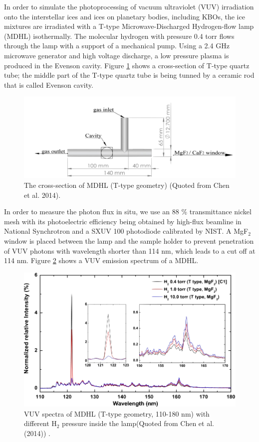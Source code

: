 In order to simulate the photoprocessing of vacuum ultraviolet (VUV) irradiation onto the interstellar ices and ices on planetary bodies, including KBOs, the ice mixtures are irradiated with a T-type Microwave-Discharged Hydrogen-flow lamp (MDHL) isothermally. The molecular hydrogen with pressure 0.4 torr flows through the lamp with a support of a mechanical pump. Using a 2.4 GHz microwave generator and high voltage discharge, a low pressure plasma is produced in the Evenson cavity. Figure \ref{fig:T_type} shows a cross-section of T-type quartz tube; the middle part of the T-type quartz tube is being tunned by a ceramic rod that is called Evenson cavity.
\begin{figure}
\centering
\includegraphics[width=\textwidth]{figures/chapter2/T_type.png}
\caption{The cross-section of MDHL (T-type geometry) (Quoted from Chen et al. 2014).}
\label{fig:T_type}
\end{figure}
In order to measure the photon flux in situ, we use an 88 \% transmittance nickel mesh with its photoelectric efficiency being obtained by high-flux beamline in National Synchrotron and a SXUV 100 photodiode calibrated by NIST. A MgF$_2$ window is placed between the lamp and the sample holder to prevent penetration of VUV photons with wavelength shorter than 114 nm, which leads to a cut off at 114 nm. Figure \ref{fig:MDHL} shows a VUV emission spectrum of a MDHL.
\begin{figure}
\centering
\includegraphics[width=\textwidth]{figures/chapter2/MDHL.png}
\caption{VUV spectra of MDHL (T-type geometry, 110-180 nm) with different H$_2$ pressure inside the lamp(Quoted from Chen et al. (2014)\cite{chen2013vacuum}) .}
\label{fig:MDHL}
\end{figure}
